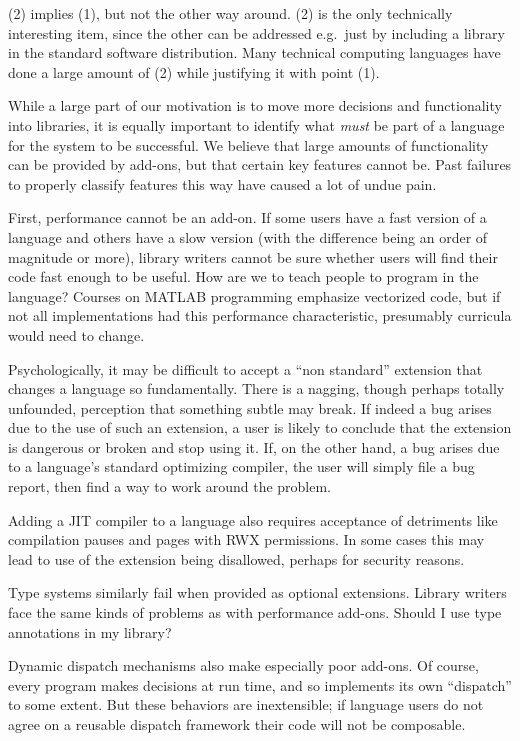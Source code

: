 {(2) implies (1), but not the other way around. (2) is the only technically
interesting item, since the other can be addressed e.g.\  just by including
a library in the standard software distribution. Many technical computing
languages have done a large amount of (2) while justifying it with point (1).


While a large part of our motivation is to move more decisions and functionality
into libraries, it is equally important to identify what {\it  must} be part of a
language for the system to be successful. We believe that large amounts of
functionality can be provided by add-ons, but that certain key features
cannot be. Past failures to properly classify features this way have
caused a lot of undue pain.

First, performance cannot be an add-on. If some users have a fast version of
a language and others have a slow version (with the difference being an
order of magnitude or more), library writers cannot be sure whether users
will find their code fast enough to be useful. How are we to teach people to
program in the language? Courses on MATLAB programming emphasize vectorized code,
but if not all implementations had this performance characteristic,
presumably curricula would need to change.

Psychologically, it may be difficult to accept a ``non standard'' extension
that changes a language so fundamentally. There is a nagging, though perhaps
totally unfounded, perception that something subtle may break. If indeed a
bug arises due to the use of such an extension, a user is likely to conclude
that the extension is dangerous or broken and stop using it. If, on the other
hand, a bug arises due to a language's standard optimizing compiler, the user
will simply file a bug report, then find a way to work around the problem.

Adding a JIT compiler to a language also requires acceptance of detriments
like compilation pauses and pages with RWX permissions. In some cases this
may lead to use of the extension being disallowed, perhaps for security
reasons.

Type systems similarly fail when provided as optional extensions. Library
writers face the same kinds of problems as with performance add-ons. Should I
use type annotations in my library?

Dynamic dispatch mechanisms also make especially poor add-ons. Of course,
every program makes decisions at run time, and so implements its own
``dispatch'' to some extent. But these behaviors are inextensible; if
language users do not agree on a reusable dispatch framework their code
will not be composable.


}
